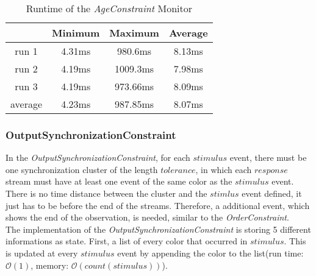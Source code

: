 	\begin{table}
		\begin{tabular}{|c|c|c|c|}
			\hline
					& Minimum & Maximum & Average \\
			\hline
			run 1	& 4.31ms & 980.6ms & 8.13ms \\
			\hline
			run 2	& 4.19ms & 1009.3ms & 7.98ms\\
			\hline
			run 3	& 4.19ms & 973.66ms & 8.09ms\\
			\hline
			average & 4.23ms & 987.85ms & 8.07ms\\
			\hline
		\end{tabular}
		\centering
		\label{tab:runtimeAgeConstraint}
		\caption{Runtime of the \emph{AgeConstraint} Monitor}
	\end{table}

\subsubsection{OutputSynchronizationConstraint}
	In the \emph{OutputSynchronizationConstraint}, for each $stimulus$ event, there must be one synchronization cluster of the length $tolerance$, in which each $response$ stream must have at least one event of the same color as the $stimulus$ event. There is no time distance between the cluster and the $stimlus$ event defined, it just has to be before the end of the streams. Therefore, a additional event, which shows the end of the observation, is needed, similar to the \emph{OrderConstraint}.\\
	The implementation of the \emph{OutputSynchronizationConstraint} is storing 5 different informations as state. First, a list of every color that occurred in $stimulus$. This is updated at every $stimulus$ event by appending the color to the list(run time: $\mathcal{O}(1)$, memory: $\mathcal{O}(count(stimulus))$). 
